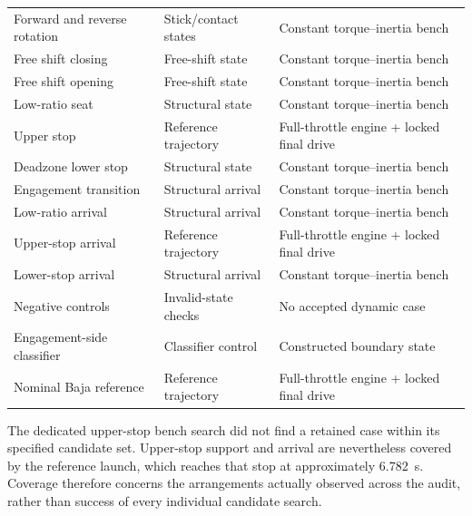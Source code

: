 \documentclass[11pt]{report}
\numberwithin{equation}{section}
\begin{document}
\begin{center}
\begin{longtable}{@{}>{\raggedright\arraybackslash}p{}>{\raggedright\arraybackslash}p{}>{\raggedright\arraybackslash}p{}@{}}
Forward and reverse rotation & Stick/contact states & Constant torque--inertia bench \\
Free shift closing & Free-shift state & Constant torque--inertia bench \\
Free shift opening & Free-shift state & Constant torque--inertia bench \\
Low-ratio seat & Structural state & Constant torque--inertia bench \\
Upper stop & Reference trajectory & Full-throttle engine + locked final drive \\
Deadzone lower stop & Structural state & Constant torque--inertia bench \\
Engagement transition & Structural arrival & Constant torque--inertia bench \\
Low-ratio arrival & Structural arrival & Constant torque--inertia bench \\
Upper-stop arrival & Reference trajectory & Full-throttle engine + locked final drive \\
Lower-stop arrival & Structural arrival & Constant torque--inertia bench \\
Negative controls & Invalid-state checks & No accepted dynamic case \\
Engagement-side classifier & Classifier control & Constructed boundary state \\
Nominal Baja reference & Reference trajectory & Full-throttle engine + locked final drive \\
\end{longtable}
\normalsize
\end{center}

The dedicated upper-stop bench search did not find a retained case within its
specified candidate set. Upper-stop support and arrival are nevertheless
covered by the reference launch, which reaches that stop at approximately
\SI{6.782}{s}. Coverage therefore concerns the arrangements actually observed
across the audit, rather than success of every individual candidate search.
\end{document}
